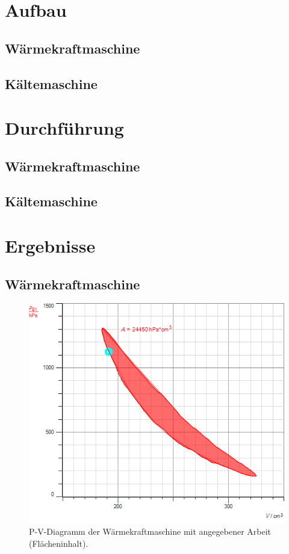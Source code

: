 \documentclass[12pt,a4paper,twopage]{article}
\begin{document}
\section{Aufbau}
\subsection{Wärmekraftmaschine}
\subsection{Kältemaschine}

\section{Durchführung}

\subsection{Wärmekraftmaschine}
\subsection{Kältemaschine}

\section{Ergebnisse}
\subsection{Wärmekraftmaschine}

\begin{center}
\begin{figure}[H]
\includegraphics[scale=0.7]{bachgraf/heissluft.png}
\caption{P-V-Diagramm der Wärmekraftmaschine mit angegebener Arbeit (Flächeninhalt).}
\label{fig:heissluft-pv}
\end{figure}
\end{center}
\end{document}

